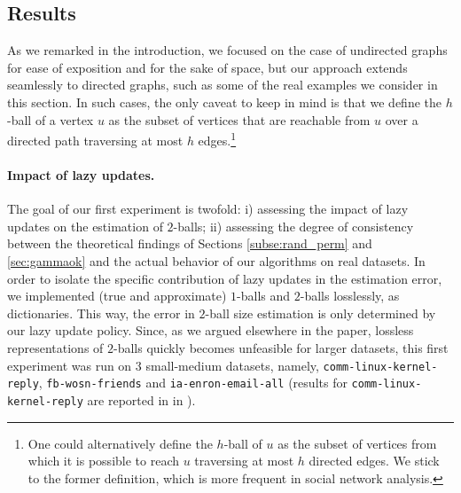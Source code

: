\subsection{Results}\label{subse:exp_res}

As we remarked in the introduction, we focused on the case of undirected graphs for ease of exposition and for the sake of space, but our approach extends seamlessly to directed graphs, such as some of the real examples we consider in this section. In such cases, the only caveat to keep in mind is that we define the $h$-ball of a vertex $u$ as the subset of vertices that are reachable from $u$ over a directed path traversing at most $h$ edges.\footnote{One could alternatively define the $h$-ball of $u$ as the subset of vertices from which it is possible to reach $u$ traversing at most $h$ directed edges. We stick to the former definition, which is more frequent in social network analysis.}

\paragraph{Impact of lazy updates.} The goal of our first experiment is twofold: i) assessing the impact of lazy updates on the estimation of $2$-balls; ii) assessing the degree of consistency between the theoretical findings of Sections \ref{subse:rand_perm} and \ref{sec:gammaok} and the actual behavior of our algorithms on real datasets. In order to isolate the specific contribution of lazy updates in the estimation error, we implemented (true and approximate) $1$-balls and $2$-balls losslessly, as dictionaries. This way, the error in $2$-ball size estimation is only determined by our lazy update policy. Since, as we argued elsewhere in the paper, lossless representations of $2$-balls quickly becomes unfeasible for larger datasets, this first experiment was run on $3$ small-medium datasets, namely, \texttt{comm-linux-kernel-reply}, \texttt{fb-wosn-friends} and \texttt{ia-enron-email-all} (results for \texttt{comm-linux-kernel-reply} are reported in  in ).

\iffalse
In particular, we used four incremental datasets using their respective incremental sequence of insertion. This gives an empirical validation on real update sequences.

We test our solutions w.r.t. their ability to estimate the balls size against real and random incremental sequences. The aim is twofolds: on the one hand, we show that our analysis on random sequences \Cref{sec:rand_worst} works in practice. One the other hand, we show that with real incremental sequences we have the same experimental results, meaning that the analysis we performed is valid for real scenario. We keep track of the error between the true and estimated sizes of two-hop balls over a suitable sample of vertices. For an individual vertex $u$, the error is measured as $\frac{\vert\ball_2(u)\vert}{\vert\apxball_2(u)\vert}$, we then also consider the Root Mean Square Error (RMSE) over the chosen sample of vertices.
\fi

